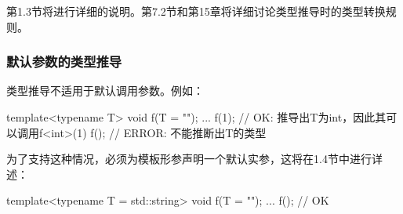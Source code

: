 第1.3节将进行详细的说明。第7.2节和第15章将详细讨论类型推导时的类型转换规则。

\subsubsection{默认参数的类型推导}

类型推导不适用于默认调用参数。例如：

\begin{cpp}
template<typename T>
void f(T = "");
...
f(1); // OK: 推导出T为int，因此其可以调用f<int>(1)
f(); // ERROR: 不能推断出T的类型
\end{cpp}

为了支持这种情况，必须为模板形参声明一个默认实参，这将在1.4节中进行详述：

\begin{cpp}
template<typename T = std::string>
void f(T = "");
...
f(); // OK
\end{cpp}














